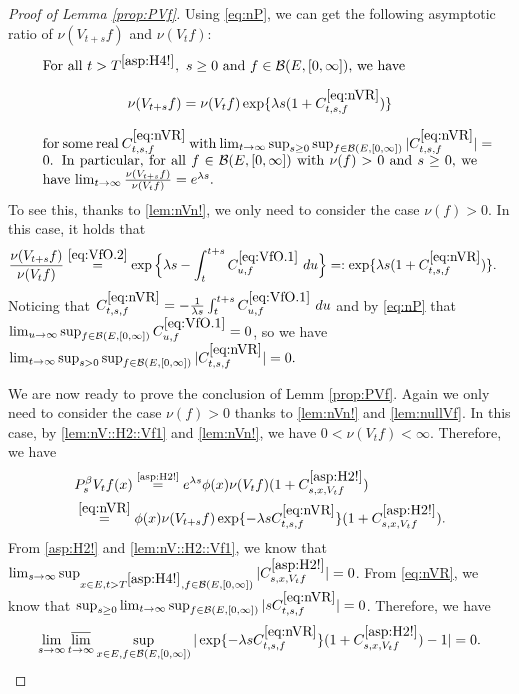 \documentclass[12pt,a4paper]{amsart}
\numberwithin{equation}{section}
\theoremstyle{plain}
\theoremstyle{definition}
\theoremstyle{remark}
\begin{document}
\begin{proof}[Proof of Lemma \ref{prop:PVf}]
	Using \eqref{eq:nP}, we can get the following asymptotic ratio of $\nu(V_{t+s}f)$ and $\nu(V_tf)$:
\begin{equation} \label{eq:nVR}
\begin{minipage}{0.9\textwidth}
	For all $t> T^{\eqref{asp:H4!}},~s \geq 0$ and $f\in \mathcal B(E,[0,\infty])$, we have \[\nu(V_{t+s}f) = \nu(V_tf) \exp\{\lambda s (1+C^{\eqref{eq:nVR}}_{t,s,f}) \}\] for some real $C^{\eqref{eq:nVR}}_{t,s,f}$ with $\lim_{t\to \infty} \sup_{s\geq  0} \sup_{f\in \mathcal B(E,[0,\infty])} |C^{\eqref{eq:nVR}}_{t,s,f}| = 0$.
	In particular, for all $f\in \mathcal B(E,[0,\infty])$ with $\nu(f)>0$ and $s\geq 0$, we have $\lim_{t\to \infty} \frac{\nu(V_{t+s}f)}{\nu(V_tf)} = e^{\lambda s}$.
\end{minipage}
\end{equation}
	To see this, thanks to \eqref{lem:nVn!},
	we only need to consider the case $\nu(f)>0$. In this case,  it holds  that
\begin{align}
	&\frac{\nu(V_{t+s} f)} {\nu(V_t f)}
	\overset{\eqref{eq:VfO.2}}= \exp\Big\{\lambda s- \int_t^{t+s} C^{\eqref{eq:VfO.1}}_{u,f} ~du\Big\}
	=: \exp\{\lambda s (1+C^{\eqref{eq:nVR}}_{t,s,f}) \}.
\end{align}
	Noticing that $C^{\eqref{eq:nVR}}_{t,s,f} = -\frac{1}{\lambda s}\int_t^{t+s} C^{\eqref{eq:VfO.1}}_{u,f} ~du$ and by \eqref{eq:nP} that $\lim_{u\to \infty}\sup_{f\in \mathcal B(E,[0,\infty])} C^{\eqref{eq:VfO.1}}_{u,f} = 0$,
	so we have $\lim_{t\to \infty} \sup_{s> 0}\sup_{f\in \mathcal B(E,[0,\infty])} |C^{\eqref{eq:nVR}}_{t,s,f}| = 0. $
	
	We are now  ready to prove the conclusion of Lemm \ref{prop:PVf}.
	Again we only need to consider the case $\nu(f)>0$ thanks to \eqref{lem:nVn!} and  \eqref{lem:nullVf}.
	In this case, by \eqref{lem:nV::H2::Vf1} and \eqref{lem:nVn!}, we have $0<\nu(V_{t}f)<\infty$.
	Therefore, we have
\begin{align}
	& P_s^\beta V_t f(x)
	\overset{\text{\eqref{asp:H2!}}}= e^{\lambda s} \phi(x) \nu(V_tf) (1+C^{\eqref{asp:H2!}}_{s,x,V_tf})
	\\&\overset{\eqref{eq:nVR}}= \phi(x) \nu(V_{t+s}f) \exp\{-\lambda s C^{\eqref{eq:nVR}}_{t,s,f}\} (1+C^{\eqref{asp:H2!}}_{s,x,V_tf}).
\end{align}
	From \eqref{asp:H2!} and \eqref{lem:nV::H2::Vf1}, we know that $\lim_{s\to \infty} \sup_{x\in E, t> T^{\eqref{asp:H4!}}, f\in \mathcal B(E,[0,\infty])}
	|C^{\eqref{asp:H2!}}_{s,x,V_tf}| = 0$.
	From \eqref{eq:nVR}, we know that $\sup_{s\geq 0} \lim_{t\to \infty} \sup_{f\in \mathcal B(E,[0,\infty])}
	|sC^{\eqref{eq:nVR}}_{t,s,f}| = 0$.
	Therefore, we have
	\[
	\lim_{s\to \infty}\varlimsup_{t\to \infty}\sup_{x\in E, f\in \mathcal B(E,[0,\infty])}
	|\exp\{-\lambda s C^{\eqref{eq:nVR}}_{t,s,f}\} (1+C^{\eqref{asp:H2!}}_{s,x,V_tf})-1| = 0. \qedhere\]
\end{proof}
\end{document}

